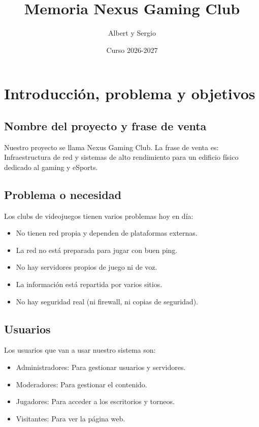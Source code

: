 \documentclass{article}
\title{Memoria Nexus Gaming Club}
\author{Albert y Sergio}
\date{Curso 2026-2027}
\begin{document}
\maketitle

\section{Introducción, problema y objetivos}

\subsection{Nombre del proyecto y frase de venta}
Nuestro proyecto se llama Nexus Gaming Club. 
La frase de venta es: Infraestructura de red y sistemas de alto rendimiento para un edificio físico dedicado al gaming y eSports.

\subsection{Problema o necesidad}
Los clubs de videojuegos tienen varios problemas hoy en día:
\begin{itemize}
    \item No tienen red propia y dependen de plataformas externas.
    \item La red no está preparada para jugar con buen ping.
    \item No hay servidores propios de juego ni de voz.
    \item La información está repartida por varios sitios.
    \item No hay seguridad real (ni firewall, ni copias de seguridad).
\end{itemize}

\subsection{Usuarios}
Los usuarios que van a usar nuestro sistema son:
\begin{itemize}
    \item Administradores: Para gestionar usuarios y servidores.
    \item Moderadores: Para gestionar el contenido.
    \item Jugadores: Para acceder a los escritorios y torneos.
    \item Visitantes: Para ver la página web.
\end{itemize}
\end{document}
